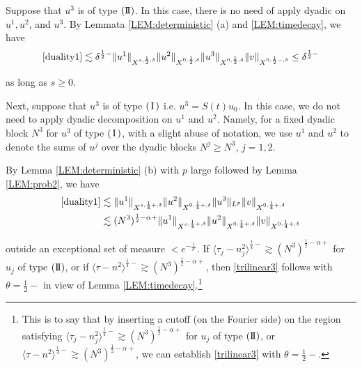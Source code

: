 \documentclass[11pt]{amsart}
\numberwithin{equation}{section} \numberwithin{theorem}{section}
\begin{document}
Suppose that  $u^3$ is of type $({\text{I \hspace{-2.8mm} I} })$.
In this case, there is no need of apply dyadic on $u^1, u^2$, and $u^3$.
By Lemmata \ref{LEM:deterministic} (a) and  \ref{LEM:timedecay}, we have 
\begin{equation*}
	\eqref{duality1} 
	\lesssim {\delta}^{\frac{1}{2}-} \| u^1\|_{X^{s, \frac{1}{2}, {\delta}}} \| u^2\|_{X^{0, \frac{1}{2}, {\delta}}}\| u^3\|_{X^{0, \frac{1}{2}, {\delta}}} 
	\| v\|_{X^{0, \frac{1}{2}-, {\delta}}}
	\leq {\delta}^{\frac{1}{2}-} 
\end{equation*}

{
\noindent} as long as $s \geq 0$. 

Next, suppose that $u^3$ is of type $({\hspace{0.5mm}\text{I}\hspace{0.5mm}})$ i.e. $u^3 = S(t) u_0$.
In this case, we do not need to apply dyadic decomposition on $u^1$ and $u^2$.
Namely, for a fixed dyadic block $N^3$ for $u^3$ of type $({\hspace{0.5mm}\text{I}\hspace{0.5mm}})$, 
with a slight abuse of notation, 
we  use $u^1$ and $u^2$ to denote the sums of $u^j$ over the dyadic blocks $N^j \geq N^3$, $j = 1, 2$.

By Lemma \ref{LEM:deterministic} (b) with $p$ large followed by
Lemma \ref{LEM:prob2}, we have 
\begin{align*}
	\eqref{duality1} 
	& \lesssim  \| u^1\|_{X^{s, \frac{1}{4}+, {\delta}}} \| u^2\|_{X^{0, \frac{1}{4}+, {\delta}}} \| u^3\|_{L^p} 
	\| v\|_{X^{0,\frac{1}{4}+, {\delta}}} \\
	& \lesssim (N^3)^{\frac{1}{2}-{\alpha}+} \| u^1\|_{X^{s, \frac{1}{4}+, {\delta}}} \| u^2\|_{X^{0, \frac{1}{4}+, {\delta}}} \| v\|_{X^{0, \frac{1}{4}+, {\delta}}} 
\end{align*}

{
\noindent} outside an exceptional set of measure $< e^{-\frac{1}{{\delta}^c}}$. If ${\langle {\tau_j - n_j^2} \rangle}^{\frac{1}{4}-} \gtrsim (N^3)^{\frac{1}{2}-{\alpha}+}$ for $u_j$ of type $({\text{I \hspace{-2.8mm} I} })$, or if ${\langle {\tau - n^2} \rangle}^{\frac{1}{4}-} \gtrsim (N^3)^{\frac{1}{2}-{\alpha}+}$, then \eqref{trilinear3} follows with $\theta = \frac{1}{2}-$ in view of Lemma \ref{LEM:timedecay}.\footnote{This 
is to say that by inserting a cutoff (on the Fourier side)
on the region
satisfying ${\langle {\tau_j - n_j^2} \rangle}^{\frac{1}{4}-} \gtrsim (N^3)^{\frac{1}{2}-{\alpha}+}$ for $u_j$ of type $({\text{I \hspace{-2.8mm} I} })$, or ${\langle {\tau - n^2} \rangle}^{\frac{1}{4}-} \gtrsim (N^3)^{\frac{1}{2}-{\alpha}+}$, 
we can establish \eqref{trilinear3} with $\theta = \frac{1}{2}-$.}
\end{document}
